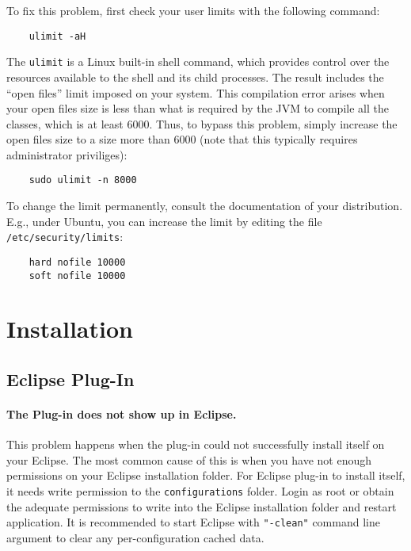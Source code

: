 \noindent To fix this problem, first check your user limits with the
following command:
\begin{verbatim}
    ulimit -aH
\end{verbatim}
The \texttt{ulimit} is a Linux built-in shell command, which provides
control over the resources available to the shell and its child
processes. The result includes the ``open files'' limit imposed on
your system. This compilation error arises when your open files
size is less than what is required by the JVM to compile all the
classes, which is at least 6000. Thus, to bypass this problem, simply
increase the open files size to a size more than 6000 (note that this
typically requires administrator priviliges):
\begin{verbatim}
    sudo ulimit -n 8000
\end{verbatim}
To change the limit permanently, consult the documentation of your
distribution. E.g., under Ubuntu, you can increase the limit by
editing the file \verb=/etc/security/limits=:
\begin{verbatim}
    hard nofile 10000
    soft nofile 10000
\end{verbatim}

\section{Installation}
\subsection{Eclipse Plug-In}
\label{trouble:eclipse_install}
\paragraph{The Plug-in does not show up in Eclipse.} This problem happens when the plug-in could not successfully install itself on your Eclipse. The most common cause of this is when you have not enough permissions on your Eclipse installation folder. For Eclipse plug-in to install itself, it needs write permission to the \texttt{configurations} folder. Login as root or obtain the adequate permissions to write into the Eclipse installation folder and restart application.
It is recommended to start Eclipse with \texttt{"-clean"} command line argument to clear any per-configuration cached data.
